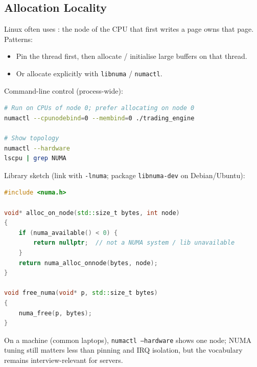 \subsection{Allocation Locality}
\label{subsec:numa-allocation-locality}
Linux often uses : the node of the CPU that first writes a page 
owns that page. Patterns:
\begin{itemize}
    \item Pin the thread first, then allocate / initialise large buffers on that thread.
    \item Or allocate explicitly with \texttt{libnuma} / \texttt{numactl}.
\end{itemize}
Command-line control (process-wide):
\begin{lstlisting}[language=bash]
# Run on CPUs of node 0; prefer allocating on node 0
numactl --cpunodebind=0 --membind=0 ./trading_engine

# Show topology
numactl --hardware
lscpu | grep NUMA
\end{lstlisting}
Library sketch (link with \texttt{-lnuma}; package \texttt{libnuma-dev} on Debian/Ubuntu):
\begin{lstlisting}[language=C++]
#include <numa.h>

void* alloc_on_node(std::size_t bytes, int node)
{
    if (numa_available() < 0) {
        return nullptr;  // not a NUMA system / lib unavailable
    }
    return numa_alloc_onnode(bytes, node);
}

void free_numa(void* p, std::size_t bytes)
{
    numa_free(p, bytes);
}
\end{lstlisting}
On a  machine (common laptops), \texttt{numactl --hardware} shows one node; 
NUMA tuning still matters less than pinning and IRQ isolation, but the vocabulary remains 
interview-relevant for servers.

